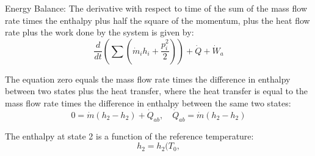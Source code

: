 Energy Balance:
The derivative with respect to time of the sum of the mass flow rate times the enthalpy plus half the square of the momentum, plus the heat flow rate plus the work done by the system is given by:
\[ \frac{d}{dt} \left( \sum \left( \dot{m}_i h_i + \frac{p_i^2}{2} \right) \right) + \dot{Q} + \dot{W}_a \]

The equation zero equals the mass flow rate times the difference in enthalpy between two states plus the heat transfer, where the heat transfer is equal to the mass flow rate times the difference in enthalpy between the same two states:
\[ 0 = \dot{m} (h_2 - h_2) + \dot{Q}_{ab}, \quad \dot{Q}_{ab} = \dot{m} (h_2 - h_2) \]

The enthalpy at state 2 is a function of the reference temperature:
\[ h_2 = h_2 (T_0, \]